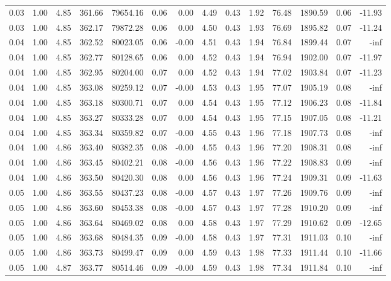 \begin{table}[!ht]
\begin{tabular}{rrrrrrrrrrrrrr}
0.03 & 1.00 & 4.85 & 361.66 & 79654.16 & 0.06 & 0.00 & 4.49 & 0.43 & 1.92 & 76.48 & 1890.59 & 0.06 & -11.93 \\
0.03 & 1.00 & 4.85 & 362.17 & 79872.28 & 0.06 & 0.00 & 4.50 & 0.43 & 1.93 & 76.69 & 1895.82 & 0.07 & -11.24 \\
0.04 & 1.00 & 4.85 & 362.52 & 80023.05 & 0.06 & -0.00 & 4.51 & 0.43 & 1.94 & 76.84 & 1899.44 & 0.07 & -inf \\
0.04 & 1.00 & 4.85 & 362.77 & 80128.65 & 0.06 & 0.00 & 4.52 & 0.43 & 1.94 & 76.94 & 1902.00 & 0.07 & -11.97 \\
0.04 & 1.00 & 4.85 & 362.95 & 80204.00 & 0.07 & 0.00 & 4.52 & 0.43 & 1.94 & 77.02 & 1903.84 & 0.07 & -11.23 \\
0.04 & 1.00 & 4.85 & 363.08 & 80259.12 & 0.07 & -0.00 & 4.53 & 0.43 & 1.95 & 77.07 & 1905.19 & 0.08 & -inf \\
0.04 & 1.00 & 4.85 & 363.18 & 80300.71 & 0.07 & 0.00 & 4.54 & 0.43 & 1.95 & 77.12 & 1906.23 & 0.08 & -11.84 \\
0.04 & 1.00 & 4.85 & 363.27 & 80333.28 & 0.07 & 0.00 & 4.54 & 0.43 & 1.95 & 77.15 & 1907.05 & 0.08 & -11.21 \\
0.04 & 1.00 & 4.85 & 363.34 & 80359.82 & 0.07 & -0.00 & 4.55 & 0.43 & 1.96 & 77.18 & 1907.73 & 0.08 & -inf \\
0.04 & 1.00 & 4.86 & 363.40 & 80382.35 & 0.08 & -0.00 & 4.55 & 0.43 & 1.96 & 77.20 & 1908.31 & 0.08 & -inf \\
0.04 & 1.00 & 4.86 & 363.45 & 80402.21 & 0.08 & -0.00 & 4.56 & 0.43 & 1.96 & 77.22 & 1908.83 & 0.09 & -inf \\
0.04 & 1.00 & 4.86 & 363.50 & 80420.30 & 0.08 & 0.00 & 4.56 & 0.43 & 1.96 & 77.24 & 1909.31 & 0.09 & -11.63 \\
0.05 & 1.00 & 4.86 & 363.55 & 80437.23 & 0.08 & -0.00 & 4.57 & 0.43 & 1.97 & 77.26 & 1909.76 & 0.09 & -inf \\
0.05 & 1.00 & 4.86 & 363.60 & 80453.38 & 0.08 & -0.00 & 4.57 & 0.43 & 1.97 & 77.28 & 1910.20 & 0.09 & -inf \\
0.05 & 1.00 & 4.86 & 363.64 & 80469.02 & 0.08 & 0.00 & 4.58 & 0.43 & 1.97 & 77.29 & 1910.62 & 0.09 & -12.65 \\
0.05 & 1.00 & 4.86 & 363.68 & 80484.35 & 0.09 & -0.00 & 4.58 & 0.43 & 1.97 & 77.31 & 1911.03 & 0.10 & -inf \\
0.05 & 1.00 & 4.86 & 363.73 & 80499.47 & 0.09 & 0.00 & 4.59 & 0.43 & 1.98 & 77.33 & 1911.44 & 0.10 & -11.66 \\
0.05 & 1.00 & 4.87 & 363.77 & 80514.46 & 0.09 & -0.00 & 4.59 & 0.43 & 1.98 & 77.34 & 1911.84 & 0.10 & -inf \\

\end{tabular}
\end{table}
